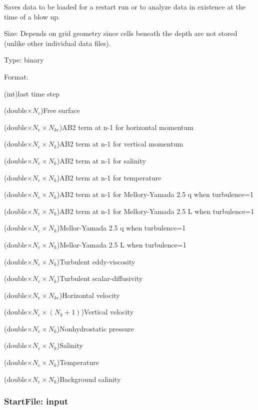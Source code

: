 Saves data to be loaded for a restart run or to analyze data in existence at the time of
a blow up.    
\begin{list}{}
\item Size: Depends on grid geometry since cells beneath the depth are not stored (unlike other
individual data files).
\item Type: binary
\item Format: 
\begin{list}{}
\item (int)last time step
\item (double$\times N_c$)Free surface
\item (double$\times N_e \times N_{ke}$)AB2 term at n-1 for horizontal momentum 
\item (double$\times N_c \times N_{k}$)AB2 term at n-1 for vertical momentum 
\item (double$\times N_c \times N_{k}$)AB2 term at n-1 for salinity
\item (double$\times N_c \times N_{k}$)AB2 term at n-1 for temperature
\item (double$\times N_c \times N_{k}$)AB2 term at n-1 for Mellory-Yamada 2.5 q when turbulence=1
\item (double$\times N_c \times N_{k}$)AB2 term at n-1 for Mellory-Yamada 2.5 L  when turbulence=1
\item (double$\times N_c \times N_{k}$)Mellor-Yamada 2.5 q  when turbulence=1
\item (double$\times N_c \times N_{k}$)Mellor-Yamada 2.5 L  when turbulence=1
\item (double$\times N_c \times N_{k}$)Turbulent eddy-viscosity
\item (double$\times N_c \times N_{k}$)Turbulent scalar-diffusivity
\item (double$\times N_e \times N_{ke}$)Horizontal velocity
\item (double$\times N_c \times (N_{k}+1)$)Vertical velocity
\item (double$\times N_c \times N_{k}$)Nonhydrostatic pressure 
\item (double$\times N_c \times N_{k}$)Salinity
\item (double$\times N_c \times N_{k}$)Temperature
\item (double$\times N_c \times N_{k}$)Background salinity 
\end{list}
\end{list}

\subsubsection{StartFile: input}

